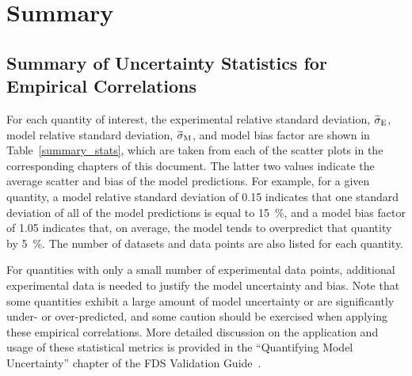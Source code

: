 
\chapter{Summary}
\label{Summary_Chapter}

\section*{Summary of Uncertainty Statistics for Empirical Correlations}

For each quantity of interest, the experimental relative standard deviation, $\widetilde{\sigma}_{\rm E}$, model relative standard deviation, $\widetilde{\sigma}_{\rm M}$, and model bias factor are shown in Table~\ref{summary_stats}, which are taken from each of the scatter plots in the corresponding chapters of this document. The latter two values indicate the average scatter and bias of the model predictions. For example, for a given quantity, a model relative standard deviation of 0.15 indicates that one standard deviation of all of the model predictions is equal to 15~\%, and a model bias factor of 1.05 indicates that, on average, the model tends to overpredict that quantity by 5~\%. The number of datasets and data points are also listed for each quantity.

For quantities with only a small number of experimental data points, additional experimental data is needed to justify the model uncertainty and bias. Note that some quantities exhibit a large amount of model uncertainty or are significantly under- or over-predicted, and some caution should be exercised when applying these empirical correlations. More detailed discussion on the application and usage of these statistical metrics is provided in the ``Quantifying Model Uncertainty'' chapter of the FDS Validation Guide~\cite{FDS_Validation_Guide}.

